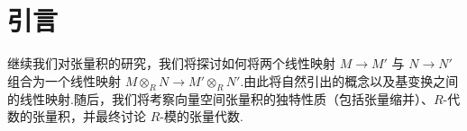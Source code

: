 \section{引言}
\label{sec:intro}

继续我们对张量积的研究，我们将探讨如何将两个线性映射 $M \to M'$ 与 $N \to N'$ 组合为一个线性映射 $M \otimes_R N \to M' \otimes_R N'$.由此将自然引出的概念以及基变换之间的线性映射.随后，我们将考察向量空间张量积的独特性质（包括张量缩并）、$R$-代数的张量积，并最终讨论 $R$-模的张量代数.
